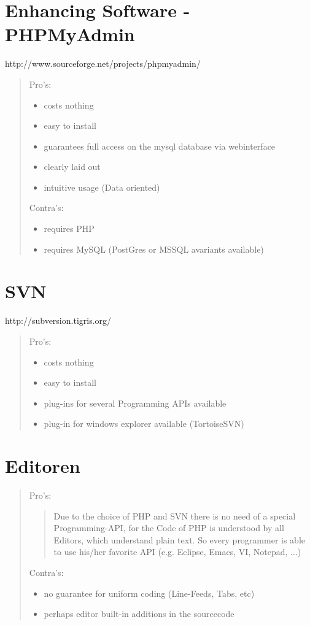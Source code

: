 \documentclass{article}
\begin{document}
\section{Enhancing Software - PHPMyAdmin}
http://www.sourceforge.net/projects/phpmyadmin/
\begin{quote}
  Pro's:
  \begin{itemize}
    \item costs nothing
	\item easy to install
	\item guarantees full access on the mysql database via webinterface
	\item clearly laid out
	\item intuitive usage (Data oriented)
  \end{itemize}
  Contra's:
  \begin{itemize}
    \item requires PHP
	\item requires MySQL (PostGres or MSSQL avariants available)
  \end{itemize}
\end{quote}


\section{SVN}
http://subversion.tigris.org/
\begin{quote}
  Pro's:
  \begin{itemize}
    \item costs nothing
	\item easy to install
	\item plug-ins for several Programming APIs available
	\item plug-in for windows explorer available (TortoiseSVN)
  \end{itemize}
\end{quote}


\section{Editoren}
\begin{quote}
  Pro's:
  \begin{quote}
    Due to the choice of PHP and SVN there is no need of a special Programming-API,
	for the Code of PHP is understood by all Editors, which understand plain text.
	So every programmer is able to use his/her favorite API (e.g. Eclipse, Emacs, VI, Notepad, ...)
  \end{quote}
  Contra's:
  \begin{itemize}
    \item no guarantee for uniform coding (Line-Feeds, Tabs, etc)
	\item perhaps editor built-in additions in the sourcecode
  \end{itemize}
\end{quote}
\end{document}

